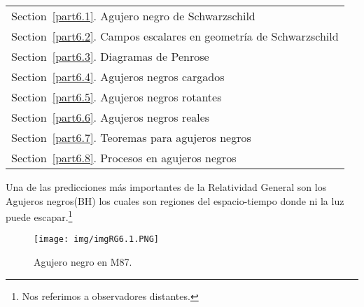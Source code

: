 \documentclass[../main]{subfiles}
\begin{document}
        \begin{margintable}\vspace{1.3in}\footnotesize
		\begin{tabularx}{\marginparwidth}{|X}
		  Section~\ref{part6.1}. Agujero negro de Schwarzschild\\
            Section~\ref{part6.2}. Campos escalares en geometría de Schwarzschild\\
            Section~\ref{part6.3}. Diagramas de Penrose\\
            Section~\ref{part6.4}. Agujeros negros cargados\\
            Section~\ref{part6.5}. Agujeros negros rotantes\\
            Section~\ref{part6.6}. Agujeros negros reales\\
            Section~\ref{part6.7}. Teoremas para agujeros negros\\
            Section~\ref{part6.8}. Procesos en agujeros negros\\
		\end{tabularx}
	\end{margintable}

    Una de las predicciones más importantes de la Relatividad General son los Agujeros negros(BH) los cuales son regiones del espacio-tiempo donde ni la luz puede escapar.\footnote{Nos referimos a observadores distantes.}
\begin{figure}[H]
    \begin{center}
        \texttt{[image: img/imgRG6.1.PNG]}
        \caption{Agujero negro en M87.}
    \end{center}
\end{figure}
\end{document}
